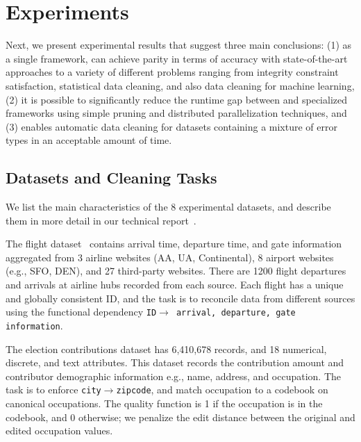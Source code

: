 \section{Experiments}\label{s:exp}
Next, we present experimental results that suggest three main conclusions: (1) as a single framework, \sys can achieve parity in terms of accuracy with state-of-the-art approaches to a variety of different problems ranging from integrity constraint satisfaction, statistical data cleaning, and also data cleaning for machine learning, (2) it is possible to significantly reduce the runtime gap between \sys and specialized frameworks using simple pruning and distributed parallelization techniques, and (3) \sys enables automatic data cleaning for datasets containing a mixture of error types in an acceptable amount of time.  

\subsection{Datasets and Cleaning Tasks}
We list the main characteristics of the 8 experimental datasets, and describe them in more detail in our technical report~\cite{xxx}.

 The flight dataset~\cite{data-flights} contains arrival time, departure time, and gate information aggregated from 3 airline websites (AA, UA, Continental), 8 airport websites (e.g., SFO, DEN), and 27 third-party websites.
There are 1200 flight departures and arrivals at airline hubs recorded from each source.  Each flight has a unique and globally consistent ID, and the task is to reconcile data from different sources using the functional dependency \texttt{ID$\rightarrow$ arrival, departure, gate information}.


 The election contributions dataset has 6,410,678 records, and 18 numerical, discrete, and text attributes. This dataset records the contribution amount and contributor demographic information e.g., name, address, and occupation.  The task is to enforce \texttt{city$\rightarrow$zipcode}, and match occupation to a codebook on canonical occupations.  The quality function is 1 if the occupation is in the codebook, and 0 otherwise; we penalize the edit distance between the original and edited occupation values.

